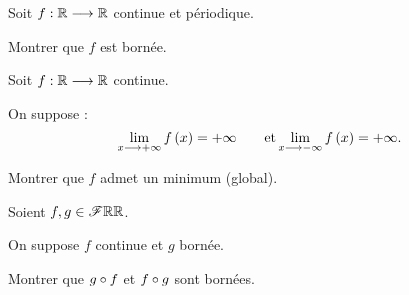 \begin{corr}
\end{corr}

\begin{exo}
Soit \(f:\mathbb{R}\longrightarrow\mathbb{R}\) continue et périodique.

Montrer que \(f\) est bornée.
\end{exo}

\begin{corr}
\end{corr}

\begin{exo}
Soit \(f:\mathbb{R}\longrightarrow\mathbb{R}\) continue.

On suppose : \[\lim_{x\longrightarrow+\infty}f\left(x\right)=+\infty\qquad\text{et}\lim_{x\longrightarrow-\infty}f\left(x\right)=+\infty.\]

Montrer que \(f\) admet un minimum (global).
\end{exo}

\begin{corr}
\end{corr}

\begin{exo}
Soient \(f,g\in\mathscr{F}{\mathbb{R}}{\mathbb{R}}\).

On suppose \(f\) continue et \(g\) bornée.

Montrer que \(g\circ f\) et \(f\circ g\) sont bornées.
\end{exo}

\begin{corr}
\end{corr}

